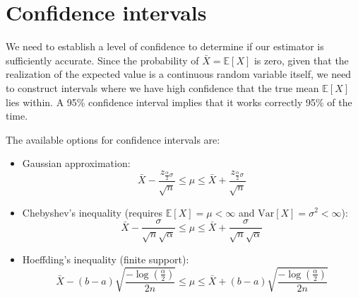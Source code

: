 \section{Confidence intervals}

We need to establish a level of confidence to determine if our estimator is sufficiently accurate. 
Since the probability of $\bar{X}=\mathbb{E}[X]$ is zero, given that the realization of the expected value is a continuous random variable itself, we need to construct intervals where we have high confidence that the true mean $\mathbb{E}[X]$ lies within.
A 95\% confidence interval implies that it works correctly 95\% of the time.

The available options for confidence intervals are:
\begin{itemize}
    \item Gaussian approximation: 
        \[\bar{X}-\dfrac{z_{\frac{\alpha}{2}\sigma}}{\sqrt{n}} \leq \mu \leq \bar{X}+\dfrac{z_{\frac{\alpha}{2}\sigma}}{\sqrt{n}}\]
    \item Chebyshev's inequality (requires $\mathbb{E}[X]=\mu<\infty$ and $\text{Var}[X]=\sigma^2<\infty$):
        \[\bar{X}-\dfrac{\sigma}{\sqrt{n}\sqrt{\alpha}} \leq \mu \leq \bar{X}+\dfrac{\sigma}{\sqrt{n}\sqrt{\alpha}}\]
    \item Hoeffding's inequality (finite support): 
        \[\bar{X}-(b-a)\sqrt{\dfrac{-\log(\frac{\alpha}{2})}{2n}} \leq \mu \leq \bar{X}+(b-a)\sqrt{\dfrac{-\log(\frac{\alpha}{2})}{2n}}\]
\end{itemize}